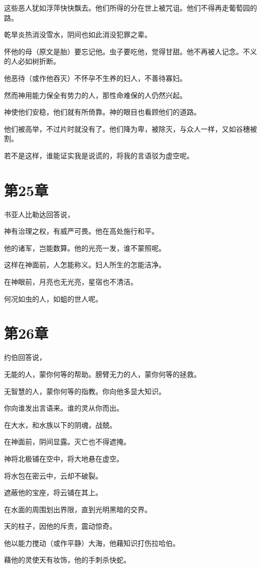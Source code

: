 \documentclass[12pt,oneside]{book}
\begin{document}
这些恶人犹如浮萍快快飘去。他们所得的分在世上被咒诅。他们不得再走葡萄园的路。

乾旱炎热消没雪水，阴间也如此消没犯罪之辈。

怀他的母（原文是胎）要忘记他。虫子要吃他，觉得甘甜。他不再被人记念。不义的人必如树折断。

他恶待（或作他吞灭）不怀孕不生养的妇人，不善待寡妇。

然而神用能力保全有势力的人，那性命难保的人仍然兴起。

神使他们安稳，他们就有所倚靠。神的眼目也看顾他们的道路。

他们被高举，不过片时就没有了。他们降为卑，被除灭，与众人一样，又如谷穗被割。

若不是这样，谁能证实我是说谎的，将我的言语驳为虚空呢。


\chapter{第25章}
书亚人比勒达回答说，

神有治理之权，有威严可畏。他在高处施行和平。

他的诸军，岂能数算。他的光亮一发，谁不蒙照呢。

这样在神面前，人怎能称义。妇人所生的怎能洁净。

在神眼前，月亮也无光亮，星宿也不清洁。

何况如虫的人，如蛆的世人呢。


\chapter{第26章}
约伯回答说，

无能的人，蒙你何等的帮助。膀臂无力的人，蒙你何等的拯救。

无智慧的人，蒙你何等的指教。你向他多显大知识。

你向谁发出言语来。谁的灵从你而出。

在大水，和水族以下的阴魂，战兢。

在神面前，阴间显露。灭亡也不得遮掩。

神将北极铺在空中，将大地悬在虚空。

将水包在密云中，云却不破裂。

遮蔽他的宝座，将云铺在其上。

在水面的周围划出界限，直到光明黑暗的交界。

天的柱子，因他的斥责，震动惊奇。

他以能力搅动（或作平静）大海，他藉知识打伤拉哈伯。

藉他的灵使天有妆饰，他的手刺杀快蛇。
\end{document}
